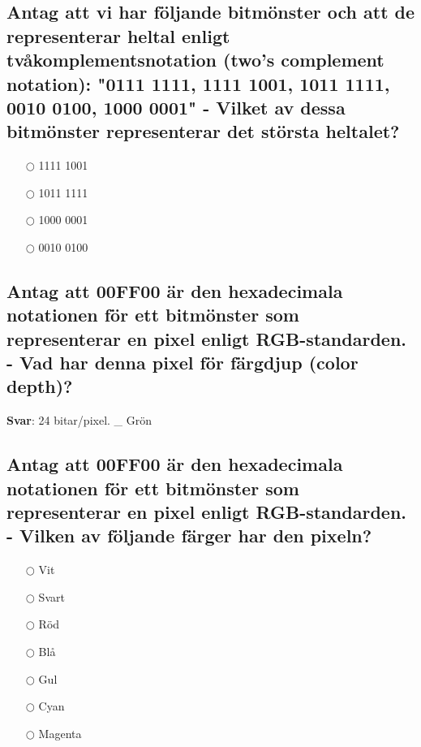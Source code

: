 \documentclass[a4paper,11pt,oneside]{article}
\begin{document}
\begin{sloppypar}
\subsection{Antag att vi har f\"oljande bitm\"onster och att de representerar heltal enligt tv\r{a}komplementsnotation (two{\textquoteright}s complement notation): "0111 1111, 1111 1001, 1011 1111, 0010 0100, 1000 0001" - Vilket av dessa bitm\"onster representerar det st\"orsta heltalet?}

\label{q:3480001:mc:sv:True}

\begin{itemize}
  \item[$\bigcirc$] 1111 1001
  \item[$\bigcirc$] 1011 1111
  \item[$\bigcirc$] 1000 0001
  \item[$\bigcirc$] 0010 0100
\end{itemize}



\subsection{Antag att 00FF00 \"ar den hexadecimala notationen f\"or ett bitm\"onster som representerar en pixel enligt RGB-standarden. - Vad har denna pixel f\"or f\"argdjup (color depth)?}

\label{q:34900:sa:sv:True}

\textbf{Svar}: 24 bitar/pixel. _ Gr\"on

\subsection{Antag att 00FF00 \"ar den hexadecimala notationen f\"or ett bitm\"onster som representerar en pixel enligt RGB-standarden. - Vilken av f\"oljande f\"arger har den pixeln?}

\label{q:3490001:mc:sv:True}

\begin{itemize}
  \item[$\bigcirc$] Vit
  \item[$\bigcirc$] Svart
  \item[$\bigcirc$] R\"od
  \item[$\bigcirc$] Bl\r{a}
  \item[$\bigcirc$] Gul
  \item[$\bigcirc$] Cyan
  \item[$\bigcirc$] Magenta
\end{itemize}




\end{sloppypar}
\end{document}

